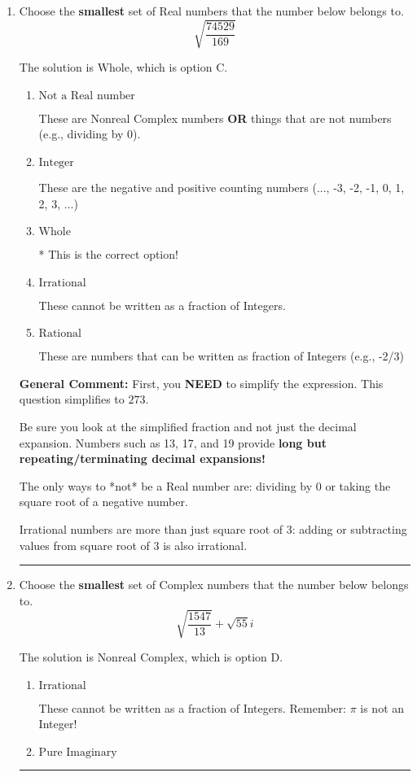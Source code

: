 \documentclass{extbook}[14pt]
\newcommand{\litem}[1]{\item #1

\rule{\textwidth}{0.4pt}}
\begin{document}
\begin{enumerate}\litem{
Choose the \textbf{smallest} set of Real numbers that the number below belongs to.
\[ \sqrt{\frac{74529}{169}} \]

The solution is \( \text{Whole} \), which is option C.\begin{enumerate}[label=\Alph*.]
\item \( \text{Not a Real number} \)

These are Nonreal Complex numbers \textbf{OR} things that are not numbers (e.g., dividing by 0).
\item \( \text{Integer} \)

These are the negative and positive counting numbers (..., -3, -2, -1, 0, 1, 2, 3, ...)
\item \( \text{Whole} \)

* This is the correct option!
\item \( \text{Irrational} \)

These cannot be written as a fraction of Integers.
\item \( \text{Rational} \)

These are numbers that can be written as fraction of Integers (e.g., -2/3)
\end{enumerate}

\textbf{General Comment:} First, you \textbf{NEED} to simplify the expression. This question simplifies to $273$. 
 
 Be sure you look at the simplified fraction and not just the decimal expansion. Numbers such as 13, 17, and 19 provide \textbf{long but repeating/terminating decimal expansions!} 
 
 The only ways to *not* be a Real number are: dividing by 0 or taking the square root of a negative number. 
 
 Irrational numbers are more than just square root of 3: adding or subtracting values from square root of 3 is also irrational.
}
\litem{
Choose the \textbf{smallest} set of Complex numbers that the number below belongs to.
\[ \sqrt{\frac{1547}{13}}+\sqrt{55} i \]

The solution is \( \text{Nonreal Complex} \), which is option D.\begin{enumerate}[label=\Alph*.]
\item \( \text{Irrational} \)

These cannot be written as a fraction of Integers. Remember: $\pi$ is not an Integer!
\item \( \text{Pure Imaginary} \)


\end{enumerate}}
\end{enumerate}
\end{document}
